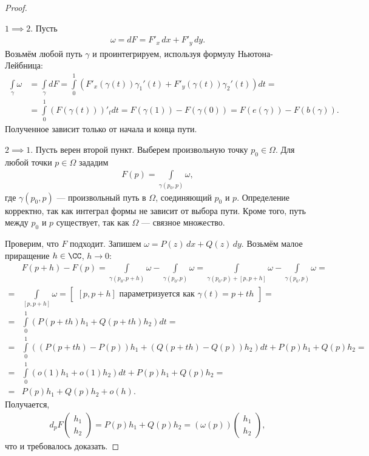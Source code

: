 \begin{proof}\

	$1 \implies 2$. Пусть
 \begin{align*}
  \omega = d F = F'_x \, dx + F'_y \, dy
 .\end{align*} Возьмём любой путь $\gamma$ и проинтегрируем, используя формулу Ньютона-Лейбница:
 \begin{align*}
   \int\limits_{\gamma} \omega &= \int\limits_{\gamma} dF = \int\limits_{0}^{1} \left( F'_x(\gamma(t)) \gamma_1'(t)  + F'_y(\gamma(t)) \gamma_2'(t) \right) dt = \\
   &= \int\limits_{0}^{1} \left( F(\gamma(t)) \right)'_t dt = F(\gamma(1)) - F(\gamma(0)) = F(e(\gamma)) - F(b(\gamma))
 .\end{align*} Полученное зависит только от начала и конца пути.

 $2 \implies 1$. Пусть верен второй пункт. Выберем произвольную точку $p_0 \in \Omega$. Для любой точки $p \in \Omega$ зададим
  \begin{align*}
  F(p) = \int\limits_{\gamma(p_0,p)}  \omega
 ,\end{align*} где $\gamma(p_0,p)$ --- произвольный путь в  $\Omega$, соединяющий $p_0$ и $p$.   Определение корректно, так как интеграл формы не зависит от выбора пути. Кроме того, путь между $p_0$ и $p$ существует, так как $\Omega$ --- связное множество.

 Проверим, что $F$  подходит. Запишем $\omega = P(z)\,dx + Q(z)\,dy$. Возьмём малое приращение $h \in \CC$, $h \to 0$:
 \begin{align*}
  &F(p + h) - F(p) = \int\limits_{\gamma(p_0,p + h)}  \omega - \int\limits_{\gamma(p_0,p)}  \omega = \int\limits_{\gamma(p_0,p) + [p,p+h]} \omega - \int\limits_{\gamma(p_0,p)}   \omega = \\
  = &\int\limits_{[p,p+h]}  \omega = \begin{bmatrix}
   [p,p+h] \text{ параметризуется как } \gamma(t) = p + th
  \end{bmatrix} = \\
  = &\int\limits_{0}^{1} \left( P(p+th) h_1 + Q(p+th) h_2 \right)dt = \\
  = &\int\limits_{0}^{1} \left( \left( P(p+th) - P(p) \right)h_1 + \left( Q(p+th)-Q(p) \right)h_2 \right)dt + P(p)h_1 + Q(p)h_2 = \\
  = & \int\limits_{0}^{1} \left( o(1)h_1 + o(1)h_2 \right)dt + P(p)h_1 + Q(p)h_2 = \\
  = &P(p)h_1 + Q(p)h_2 + o(h)
 .\end{align*} Получается,
 \begin{align*}
  d_p F \begin{pmatrix}
   h_1 \\ h_2
  \end{pmatrix} = P(p) h_1 + Q(p) h_2 = \left( \omega(p) \right) \begin{pmatrix}
   h_1 \\ h_2
  \end{pmatrix}
 ,\end{align*} что и требовалось доказать.
\end{proof}


